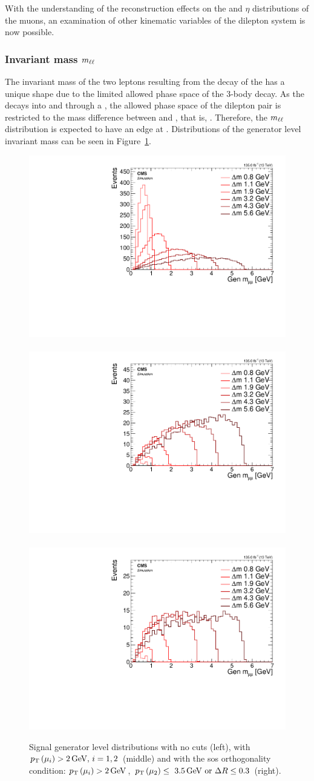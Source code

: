 With the understanding of the reconstruction effects on the \pt and $\eta$ distributions of the muons, an examination of other kinematic variables of the dilepton system is now possible.

\clearpage

\subsubsection{Invariant mass $m_{\ell\ell}$}
\label{sec:gen-invariant-mass}

The invariant mass of the two leptons resulting from the decay of the \neutt has a unique shape due to the limited allowed phase space of the 3-body decay. As the \neutt decays into \neuto and \ellell through a \PZstar, the allowed phase space of the dilepton pair is restricted to the mass difference between \neutt and \neuto, that is, \dm. Therefore, the $m_{\ell\ell}$ distribution is expected to have an edge at \dm. Distributions of the generator level invariant mass can be seen in Figure~\ref{fig:signal-generator-mll}.

\begin{figure}[!htb]
\centering
\includegraphics[width=0.32\linewidth]{plots/signal_muons_gen/none_gen_invMass.pdf} \,
\includegraphics[width=0.32\linewidth]{plots/signal_muons_gen/none_gen_invMass_cut.pdf}  \,
\includegraphics[width=0.32\linewidth]{plots/signal_muons_gen/none_gen_invMass_orth.pdf} \\
\caption[Signal generator level \mll distributions]{ Signal generator level \mll distributions with no cuts (left), with $p_{\mathrm{T}}\left(\mu_i\right)>2\,\text{Ge\hspace{-.08em}V},\,i=1,2$ (middle) and with the \gls{sos} orthogonality condition: $p_{\mathrm{T}}\left(\mu_i\right)>2\,\text{Ge\hspace{-.08em}V}$, $p_{\mathrm{T}}\left(\mu_2\right)\leq~3.5\,\text{Ge\hspace{-.08em}V}\text{ or }\Delta R\leq 0.3$ (right).}
\label{fig:signal-generator-mll}
\end{figure}

